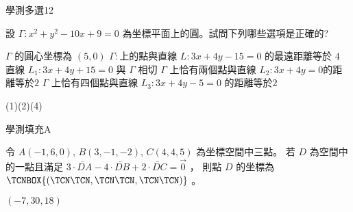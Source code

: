     \begin{QUESTION}
        \begin{ExamInfo}{97}{學測}{多選}{12}
        \end{ExamInfo}
        \begin{ExamAnsRateInfo}{34}{62}{29}{11}
        \end{ExamAnsRateInfo}
        \begin{QBODY}
            設 $\Gamma : x^2 + y^2 - 10x + 9 = 0$ 為坐標平面上的圓。試問下列哪些選項是正確的? 
			\begin{QOPS} 
				\QOP $\Gamma$ 的圓心坐標為 $(5,0)$ 
				\QOP $\Gamma:$上的點與直線 $L: 3x+4y-15=0$ 的最遠距離等於 $4 $
				\QOP 直線 $L_1 :3x+4y+15=0$ 與 $\Gamma$ 相切    
                \QOP $\Gamma$ 上恰有兩個點與直線 $L_2 :3x+4y=0 $的距離等於$2$ 
				\QOP $\Gamma$ 上恰有四個點與直線 $L_3 :3x+4y - 5=0$ 的距離等於$2$
			\end{QOPS}
        \end{QBODY}
        \begin{QFROMS}
        \end{QFROMS}
        \begin{QTAGS}\end{QTAGS}
        \begin{QANS}
            (1)(2)(4)
        \end{QANS}
        \begin{QSOLLIST}
        \end{QSOLLIST}
        \begin{QEMPTYSPACE}
        \end{QEMPTYSPACE}
    \end{QUESTION}
    \begin{QUESTION}
        \begin{ExamInfo}{97}{學測}{填充}{A}
        \end{ExamInfo}
        \begin{ExamAnsRateInfo}{47}{82}{51}{8}
        \end{ExamAnsRateInfo}
        \begin{QBODY}
            令 $A(-1,6,0)$, $B(3,-1,-2)$, $C(4,4,5)$ 為坐標空間中三點。
			若 $D$ 為空間中的一點且滿足 $3 \cdot \lvec{DA} -  4 \cdot \lvec{DB} + 2\cdot\lvec{DC}= \vec{0}$ ，
			則點 $D$ 的坐標為 $\TCNBOX{(\TCN\TCN,\TCN\TCN,\TCN\TCN)}$ 。
        \end{QBODY}
        \begin{QFROMS}
        \end{QFROMS}
        \begin{QTAGS}\end{QTAGS}
        \begin{QANS}
            $(-7,30,18)$
        \end{QANS}
        \begin{QSOLLIST}
        \end{QSOLLIST}
        \begin{QEMPTYSPACE}
        \end{QEMPTYSPACE}
    \end{QUESTION}
